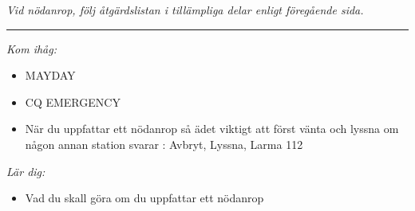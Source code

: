 \textit{Vid nödanrop, följ åtgärdslistan i tillämpliga delar enligt
  föregående sida.}

\vspace{1em} \hrule \vspace{1em}

\emph{Kom ihåg:}

\begin{itemize}
\item MAYDAY
\item CQ EMERGENCY
\item När du uppfattar ett nödanrop så ädet viktigt att först vänta och
  lyssna om någon annan station svarar
  : Avbryt, Lyssna, Larma 112
\end{itemize}

\emph{Lär dig:}

\begin{itemize}
\item  Vad du skall göra om du uppfattar ett nödanrop
\end{itemize}
